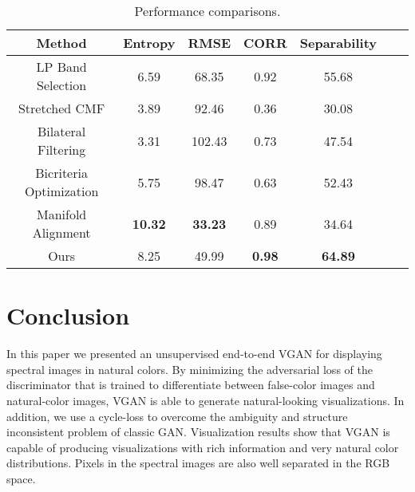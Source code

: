\documentclass[10pt,conference,a4paper]{IEEEtran}
\begin{document}
\begin{table}[t]
\centering
 \caption{Performance comparisons.}
  \label{table:performance}
  \begin{tabular}{ccccccc}
    \hline
    Method                   & Entropy        & RMSE           & CORR          & Separability           \\
    \hline
    LP Band Selection        & 6.59           & 68.35          & 0.92          & 55.68                  \\
    \hline
    Stretched CMF            & 3.89           & 92.46          & 0.36          & 30.08                  \\
    \hline
    Bilateral Filtering      & 3.31           & 102.43         & 0.73          & 47.54                  \\
    \hline
    Bicriteria Optimization  & 5.75           & 98.47          & 0.63          & 52.43                  \\
    \hline
    Manifold Alignment       & \textbf{10.32} & \textbf{33.23} & 0.89          & 34.64                  \\
    \hline
    Ours                     & 8.25           & 49.99          & \textbf{0.98} & \textbf{64.89}         \\
    \hline
  \end{tabular}
\end{table}

\section{Conclusion}
\label{sec:conclusion}
In this paper we presented an unsupervised end-to-end VGAN for displaying spectral images in natural colors.
By minimizing the adversarial loss of the discriminator that is trained to differentiate between false-color images and natural-color images, VGAN is able to generate natural-looking visualizations.
In addition, we use a cycle-loss to overcome the ambiguity and structure inconsistent problem of classic GAN.
Visualization results show that VGAN is capable of producing visualizations with rich information and very natural color distributions.
Pixels in the spectral images are also well separated in the RGB space.










\end{document}
